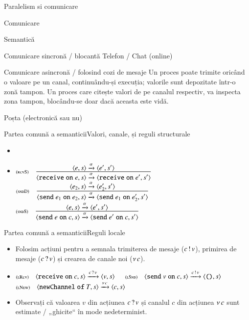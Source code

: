 \documentclass[xcolor=pdftex,romanian,colorlinks]{beamer}
\begin{document}
\begin{section}{Paralelism si comunicare}
\begin{subsection}{Comunicare}
\begin{frame}{Semantică}
\begin{block}{Comunicare sincronă / blocantă}
 Telefon / Chat (online)
\end{block}

\begin{block}{Comunicare asincronă / folosind cozi de mesaje}
Un proces poate trimite oricând o valoare pe un canal, continuându-și execuția; valorile sunt depozitate într-o zonă tampon.  Un proces care citește valori de pe canalul respectiv, va inspecta zona tampon, blocându-se doar dacă aceasta este vidă.

 Poșta (electronică sau nu) 
\end{block}
\end{frame}

\begin{frame}{Partea comună a semanticii}{Valori, canale, și reguli structurale}
\renewcommand{\syntaxKeyword}{}
\begin{itemize}
\item[] 
\item[] 
\vitem[] $\reg[rcvS]{\Ss[\alpha]{\c{\Sreceive e,s}}{\c{\Sreceive e',s'}}}{\Ss[\alpha]{\c{e,s}}{\c{e',s'}}}{}$
\vitem[] $\reg[sndD]{\Ss[\alpha]{\c{\Ssend e_1 \Son e_2,s}}{\c{\Ssend e_1 \Son e_2',s'}}}{\Ss[\alpha]{\c{e_2,s}}{\c{e_2',s'}}}{}$
\vitem[] $\reg[sndS]{\Ss[\alpha]{\c{\Ssend e \Son c,s}}{\c{\Ssend e' \Son c,s'}}}{\Ss[\alpha]{\c{e,s}}{\c{e',s'}}}{}$
\end{itemize}
\end{frame}

\begin{frame}{Partea comună a semanticii}{Reguli locale}
\renewcommand{\syntaxKeyword}{}
\begin{itemize}
\item Folosim acțiuni pentru a semnala trimiterea de mesaje ($c\,!\,v$), primirea de mesaje ($c\,?\,v$) și crearea de canale noi ($\nu\,c$).
\item[] 
\vitem[] $\reg[lRcv]{\Ss[\Arcv{c}{v}]{\c{\Sreceive c,s}}{\c{v,s}}}{}{}$
\vitem[] $\reg[lSnd]{\Ss[\Asnd{c}{v}]{\c{\Ssend v \Son c,s}}{\c{\Sskip,s}}}{}{}$
\vitem[] $\reg[lNew]{\Ss[\Anew{c}]{\c{\SnewChannel T,s}}{\c{c,s}}}{}{}$
\item Observați că valoarea $v$ din acțiunea $c\,?\,v$ și canalul $c$ din acțiunea $\nu\,c$ sunt estimate / „ghicite“ în mode nedeterminist.
\end{itemize}
\end{frame}


\end{subsection}
\end{section}
\end{document}
